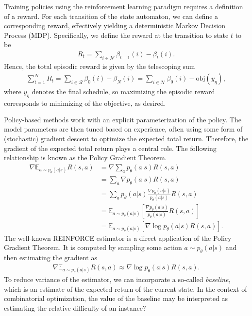 \documentclass[a4paper]{article}
\theoremstyle{definition}
\theoremstyle{plain}
\begin{document}
Training policies using the reinforcement learning paradigm requires a
definition of a reward.
%
For each transition of the state automaton, we can define a corresponding
reward, effectively yielding a deterministic Markov Decision Process (MDP).
Specifically, we define the reward at the transition to state $t$ to be
\begin{align*}
  R_{t} = \sum_{i \in \mathcal{N}} \beta_{t-1}(i) - \beta_{t}(i) .
\end{align*}
Hence, the total episodic reward is given by the telescoping sum
\begin{align*}
  \sum_{t=1}^{N} R_{t} = \sum_{i \in \mathcal{R}} \beta_{0}(i) - \beta_{N}(i)  = \sum_{i \in \mathcal{N}} \beta_{0}(i) - \textrm{obj}(y_{\eta}) ,
\end{align*}
where $y_{\eta}$ denotes the final schedule, so maximizing the episodic reward
corresponds to minimizing of the objective, as desired.


Policy-based methods work with an explicit parameterization of the policy. The
model parameters are then tuned based on experience, often using some form of
(stochastic) gradient descent to optimize the expected total return.
%
Therefore, the gradient of the expected total return plays a central role. The following relationship is known as the Policy Gradient Theorem.
\begin{align*}
  \nabla \mathbb{E}_{a \sim p_{\theta}(a | s)} R(s, a) &= \nabla \sum_{a} p_{\theta}(a | s) R(s, a) \\
  &= \sum_{a} \nabla p_{\theta}(a | s) R(s, a) \\
  &= \sum_{a} p_{\theta}(a | s) \frac{\nabla p_{\theta}(a | s)}{p_{\theta}(a | s)} R(s, a) \\
  &= \mathbb{E}_{a \sim p_{\theta}(a | s)} \left[  \frac{\nabla p_{\theta}(a | s)}{p_{\theta}(a | s)} R(s, a) \right] \\
  &= \mathbb{E}_{a \sim p_{\theta}(a | s)} [ \nabla \log p_{\theta}(a | s) R(s, a) ] .
\end{align*}
%
The well-known REINFORCE estimator is a direct application of the Policy
Gradient Theorem. It is computed by sampling some action
$a \sim p_{\theta}(a | s)$ and then estimating the gradient as
\begin{align*}
  \nabla \mathbb{E}_{a \sim p_{\theta}(a | s)} R(s, a) \approx \nabla \log p_{\theta}(a | s) R(s, a) .
\end{align*}
%
To reduce variance of the estimator, we can incorporate a so-called
\textit{baseline}, which is an estimate of the expected return of the current
state.
%
In the context of combinatorial optimization, the value of the baseline may be
interpreted as estimating the relative difficulty of an instance?
\end{document}
